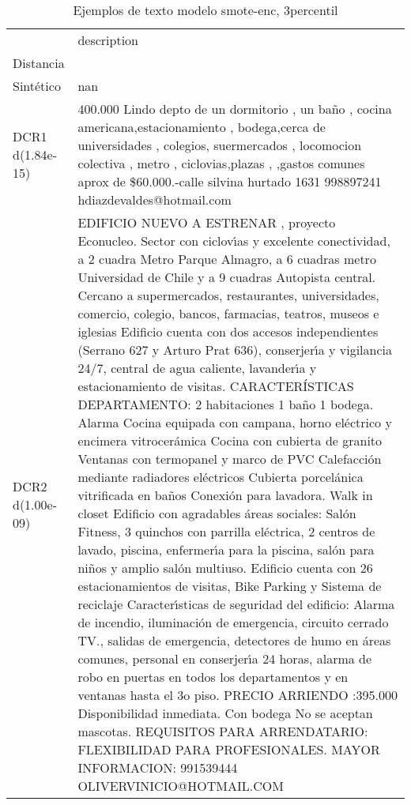 \begin{table}[H]
\centering
\fontsize{10}{14}\selectfont
\caption{Ejemplos de texto modelo smote-enc, 3percentil}
\label{table-example-economicos-b-2-smote-enc-3p-text}
\begin{tabular}{|l|m{35em}|}
\hline
\rowcolor[gray]{0.8}
 & description \\
Distancia &  \\
\hline Sintético & nan \\
\hline DCR1 d(1.84e-15) & 400.000 Lindo depto de un dormitorio , un ba\~no , cocina americana,estacionamiento , bodega,cerca de universidades , colegios, suermercados , locomocion colectiva , metro , ciclovias,plazas , ,gastos comunes aprox de \$60.000.-calle silvina hurtado 1631 998897241 hdiazdevaldes@hotmail.com \\
\hline DCR2 d(1.00e-09) & EDIFICIO NUEVO A ESTRENAR , proyecto Econucleo. 
Sector con ciclov{\'\i}as y excelente conectividad, a 2 cuadra Metro Parque Almagro, a 6 cuadras metro Universidad de Chile y a 9 cuadras Autopista central. Cercano a supermercados, restaurantes, universidades, comercio, colegio, bancos, farmacias, teatros, museos e iglesias
Edificio cuenta con dos accesos independientes (Serrano 627 y Arturo Prat 636), conserjer{\'\i}a y vigilancia 24/7, central de agua caliente, lavander{\'\i}a y estacionamiento de visitas.
CARACTER\'ISTICAS DEPARTAMENTO:
2 habitaciones
1 ba\~no
1 bodega. 
Alarma
Cocina equipada con campana, horno el\'ectrico y encimera vitrocer\'amica
Cocina con cubierta de granito
Ventanas con termopanel y marco de PVC
Calefacci\'on mediante radiadores el\'ectricos
Cubierta porcel\'anica vitrificada en ba\~nos
Conexi\'on para lavadora.
Walk in closet
Edificio con agradables \'areas sociales: Sal\'on Fitness, 3 quinchos con parrilla el\'ectrica, 2 centros de lavado, piscina, enfermer{\'\i}a para la piscina, sal\'on para ni\~nos y amplio sal\'on multiuso.
Edificio cuenta con 26 estacionamientos de visitas, Bike Parking y Sistema de reciclaje
Caracter{\'\i}sticas de seguridad del edificio: Alarma de incendio, iluminaci\'on de emergencia, circuito cerrado TV., salidas de emergencia, detectores de humo en \'areas comunes, personal en conserjer{\'\i}a 24 horas, alarma de robo en puertas en todos los departamentos y en ventanas hasta el 3o piso.
PRECIO ARRIENDO :395.000
Disponibilidad inmediata.
Con bodega 
No se aceptan mascotas.
REQUISITOS PARA ARRENDATARIO:
FLEXIBILIDAD PARA PROFESIONALES.
MAYOR INFORMACION:
991539444
OLIVERVINICIO@HOTMAIL.COM \\
\hline
\end{tabular}
\end{table}
